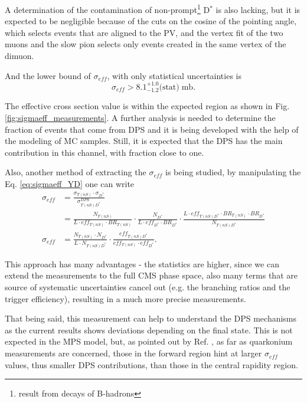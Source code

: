 A determination of the contamination of non-prompt\footnote{result from decays of B-hadrons} D$^*$ is also lacking, but it is expected to be negligible because of the cuts on the cosine of the pointing angle, which selects events that are aligned to the PV, and the vertex fit of the two muons and the slow pion selects only events created in the same vertex of the dimuon.

And the lower bound of $\sigma_{eff}$, with only statistical uncertainties is
\begin{equation}
  \sigma_{eff} > 8.1^{+1.0}_{-1.2} \text{(stat)} \; \text{mb}.
\end{equation}

The effective cross section value is within the expected region as shown in Fig. \ref{fig:sigmaeff_measurements}. A further analysis is needed to determine the fraction of events that come from DPS and it is being developed with the help of the modeling of MC samples. Still, it is expected that the DPS has the main contribution in this channel, with fraction close to one.

Also, another method of extracting the $\sigma_{eff}$ is being studied, by manipulating the Eq. \ref{eq:sigmaeff_YD} one can write
\begin{equation}
  \begin{split}
    \sigma_{eff} &= \frac{\sigma_{\Upsilon(nS)} \cdot \sigma_{D^*}}{\sigma_{\Upsilon(nS) D^*}^{DPS}} \\
    &= \frac{N_{\Upsilon(nS)}}{L \cdot eff_{\Upsilon(nS)} \cdot BR_{\Upsilon(nS)}} \cdot \frac{N_{D^*}}{L \cdot eff_{D^*} \cdot BR_{D^*}} \cdot \frac{L \cdot eff_{\Upsilon(nS) D^*} \cdot BR_{\Upsilon(nS)} \cdot BR_{D^*}}{N_{\Upsilon(nS) D^*}} \\
    \sigma_{eff} &= \frac{N_{\Upsilon(nS)} \cdot N_{D^*}}{L \cdot N_{\Upsilon(nS) D^*}} \cdot \frac{eff_{\Upsilon(nS) D^*}}{eff_{\Upsilon(nS)} \cdot eff_{D^*}}.
  \end{split}
\end{equation}

This approach has many advantages - the statistics are higher, since we can extend the measurements to the full CMS phase space, also many terms that are source of systematic uncertainties cancel out (e.g. the branching ratios and the trigger efficiency), resulting in a much more precise measurements.

That being said, this measurement can help to understand the DPS mechanisms as the current results shows deviations depending on the final state. This is not expected in the MPS model, but, as pointed out by Ref. \cite{Lansberg:2019adr}, as far as quarkonium measurements are concerned, those in the forward region hint at larger $\sigma_{eff}$ values, thus smaller DPS contributions, than those in the central rapidity region.
